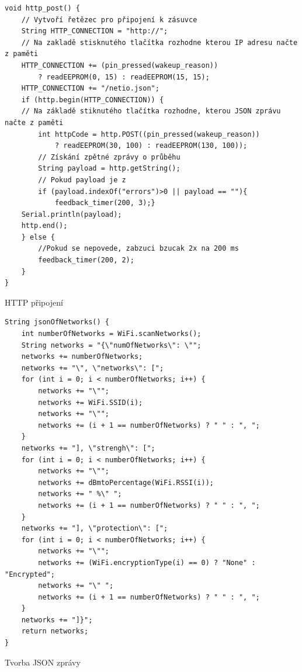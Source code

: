 \documentclass[a4paper, 12pt]{report}
\begin{document}
    \begin{listing}[]
        \begin{verbatim}
void http_post() {
    // Vytvoří řetězec pro připojení k zásuvce
    String HTTP_CONNECTION = "http://";
    // Na zakladě stisknutého tlačítka rozhodne kterou IP adresu načte z paměti
    HTTP_CONNECTION += (pin_pressed(wakeup_reason))
        ? readEEPROM(0, 15) : readEEPROM(15, 15);
    HTTP_CONNECTION += "/netio.json";
    if (http.begin(HTTP_CONNECTION)) {
    // Na základě stiknutého tlačítka rozhodne, kterou JSON zprávu načte z paměti
        int httpCode = http.POST((pin_pressed(wakeup_reason))
            ? readEEPROM(30, 100) : readEEPROM(130, 100));
        // Získání zpětné zprávy o průběhu
        String payload = http.getString();
        // Pokud payload je z
        if (payload.indexOf("errors")>0 || payload == ""){
            feedback_timer(200, 3);}
    Serial.println(payload);
    http.end();
    } else {
        //Pokud se nepovede, zabzuci bzucak 2x na 200 ms
        feedback_timer(200, 2);
    }
}
        \end{verbatim}
        \caption{HTTP připojení}
        \label{listing:http}
    \end{listing}
    \begin{listing}[]
        \begin{verbatim}
String jsonOfNetworks() {
    int numberOfNetworks = WiFi.scanNetworks();
    String networks = "{\"numOfNetworks\": \"";
    networks += numberOfNetworks;
    networks += "\", \"networks\": [";
    for (int i = 0; i < numberOfNetworks; i++) {
        networks += "\"";
        networks += WiFi.SSID(i);
        networks += "\"";
        networks += (i + 1 == numberOfNetworks) ? " " : ", ";
    }
    networks += "], \"strengh\": [";
    for (int i = 0; i < numberOfNetworks; i++) {
        networks += "\"";
        networks += dBmtoPercentage(WiFi.RSSI(i));
        networks += " %\" ";
        networks += (i + 1 == numberOfNetworks) ? " " : ", ";
    }
    networks += "], \"protection\": [";
    for (int i = 0; i < numberOfNetworks; i++) {
        networks += "\"";
        networks += (WiFi.encryptionType(i) == 0) ? "None" : "Encrypted";
        networks += "\" ";
        networks += (i + 1 == numberOfNetworks) ? " " : ", ";
    }
    networks += "]}";
    return networks;
}
        \end{verbatim}
        \caption{Tvorba JSON zprávy}
        \label{lst:json}
    \end{listing}
\end{document}

